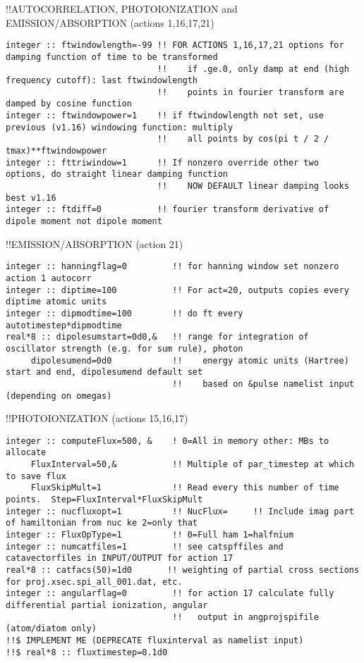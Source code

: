 !!{\large \quad AUTOCORRELATION, PHOTOIONIZATION and EMISSION/ABSORPTION (actions 1,16,17,21)}
\begin{verbatim}
integer :: ftwindowlength=-99 !! FOR ACTIONS 1,16,17,21 options for damping function of time to be transformed
                              !!    if .ge.0, only damp at end (high frequency cutoff): last ftwindowlength 
                              !!    points in fourier transform are damped by cosine function
integer :: ftwindowpower=1    !! if ftwindowlength not set, use previous (v1.16) windowing function: multiply
                              !!    all points by cos(pi t / 2 / tmax)**ftwindowpower 
integer :: fttriwindow=1      !! If nonzero override other two options, do straight linear damping function
                              !!    NOW DEFAULT linear damping looks best v1.16
integer :: ftdiff=0           !! fourier transform derivative of dipole moment not dipole moment
\end{verbatim}
!!{\large \quad EMISSION/ABSORPTION (action 21)}
\begin{verbatim}
integer :: hanningflag=0         !! for hanning window set nonzero action 1 autocorr
integer :: diptime=100           !! For act=20, outputs copies every diptime atomic units
integer :: dipmodtime=100        !! do ft every autotimestep*dipmodtime
real*8 :: dipolesumstart=0d0,&   !! range for integration of oscillator strength (e.g. for sum rule), photon
     dipolesumend=0d0            !!    energy atomic units (Hartree) start and end, dipolesumend default set
                                 !!    based on &pulse namelist input (depending on omegas)
\end{verbatim}
!!{\large \quad PHOTOIONIZATION (actions 15,16,17)}
\begin{verbatim}
integer :: computeFlux=500, &    ! 0=All in memory other: MBs to allocate
     FluxInterval=50,&           !! Multiple of par_timestep at which to save flux
     FluxSkipMult=1              !! Read every this number of time points.  Step=FluxInterval*FluxSkipMult
integer :: nucfluxopt=1          !! NucFlux=     !! Include imag part of hamiltonian from nuc ke 2=only that
integer :: FluxOpType=1          !! 0=Full ham 1=halfnium 
integer :: numcatfiles=1         !! see catspffiles and catavectorfiles in INPUT/OUTPUT for action 17
real*8 :: catfacs(50)=1d0       !! weighting of partial cross sections for proj.xsec.spi_all_001.dat, etc.
integer :: angularflag=0         !! for action 17 calculate fully differential partial ionization, angular
                                 !!   output in angprojspifile (atom/diatom only)
!!$ IMPLEMENT ME (DEPRECATE fluxinterval as namelist input) 
!!$ real*8 :: fluxtimestep=0.1d0
\end{verbatim}
